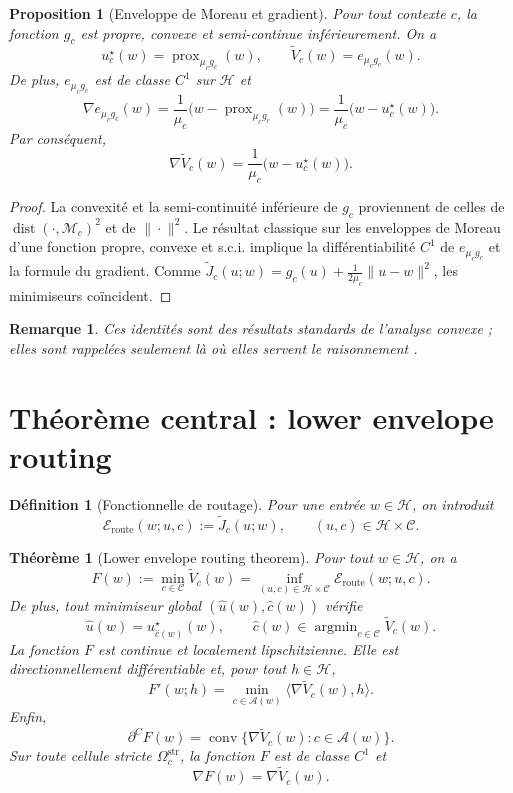 \documentclass[11pt,a4paper]{article}
\newtheorem{definition}{Définition}[section]
\newtheorem{proposition}{Proposition}[section]
\newtheorem{theorem}{Théorème}[section]
\newtheorem{remark}{Remarque}[section]
\DeclareMathOperator{\prox}{prox}
\DeclareMathOperator{\argmin}{argmin}
\DeclareMathOperator{\dist}{dist}
\DeclareMathOperator{\conv}{conv}
\newcommand{\Hh}{\mathcal H}
\newcommand{\Mcal}{\mathcal M}
\newcommand{\Ccal}{\mathcal C}
\newcommand{\Acal}{\mathcal A}
\begin{document}
\begin{proposition}[Enveloppe de Moreau et gradient]
Pour tout contexte \(c\), la fonction \(g_c\) est propre, convexe et semi-continue inférieurement. On a
\[
u_c^\star(w)=\prox_{\mu_c g_c}(w),
\qquad
\widetilde V_c(w)=e_{\mu_c g_c}(w).
\]
De plus, \(e_{\mu_c g_c}\) est de classe \(C^1\) sur \(\Hh\) et
\[
\nabla e_{\mu_c g_c}(w)=\frac{1}{\mu_c}\bigl(w-\prox_{\mu_c g_c}(w)\bigr)
=\frac{1}{\mu_c}\bigl(w-u_c^\star(w)\bigr).
\]
Par conséquent,
\[
\nabla \widetilde V_c(w)=\frac{1}{\mu_c}\bigl(w-u_c^\star(w)\bigr).
\]
\end{proposition}

\begin{proof}
La convexité et la semi-continuité inférieure de \(g_c\) proviennent de celles de \(\dist(\cdot,\Mcal_c)^2\) et de \(\|\cdot\|^2\). Le résultat classique sur les enveloppes de Moreau d'une fonction propre, convexe et s.c.i. implique la différentiabilité \(C^1\) de \(e_{\mu_c g_c}\) et la formule du gradient. Comme \(\widetilde J_c(u;w)=g_c(u)+\frac{1}{2\mu_c}\|u-w\|^2\), les minimiseurs coïncident.
\end{proof}

\begin{remark}
Ces identités sont des résultats standards de l'analyse convexe ; elles sont rappelées seulement là où elles servent le raisonnement \cite{Moreau1965,Rockafellar1970,BauschkeCombettes2017,RockafellarWets1998}.
\end{remark}

\section{Théorème central : lower envelope routing}

\begin{definition}[Fonctionnelle de routage]
Pour une entrée \(w\in\Hh\), on introduit
\[
\mathcal E_{\mathrm{route}}(w;u,c):=\widetilde J_c(u;w),
\qquad (u,c)\in\Hh\times\Ccal.
\]
\end{definition}

\begin{theorem}[Lower envelope routing theorem]
Pour tout \(w\in\Hh\), on a
\[
F(w):=\min_{c\in\Ccal}\widetilde V_c(w)
=
\inf_{(u,c)\in\Hh\times\Ccal}\mathcal E_{\mathrm{route}}(w;u,c).
\]
De plus, tout minimiseur global \((\hat u(w),\hat c(w))\) vérifie
\[
\hat u(w)=u_{\hat c(w)}^\star(w),
\qquad
\hat c(w)\in\argmin_{c\in\Ccal}\widetilde V_c(w).
\]
La fonction \(F\) est continue et localement lipschitzienne. Elle est directionnellement différentiable et, pour tout \(h\in\Hh\),
\[
F'(w;h)=\min_{c\in\Acal(w)}\langle \nabla \widetilde V_c(w),h\rangle.
\]
Enfin,
\[
\partial^C F(w)=\conv\{\nabla \widetilde V_c(w): c\in\Acal(w)\}.
\]
Sur toute cellule stricte \(\Omega_c^{\mathrm{str}}\), la fonction \(F\) est de classe \(C^1\) et
\[
\nabla F(w)=\nabla \widetilde V_c(w).
\]
\end{theorem}
\end{document}
